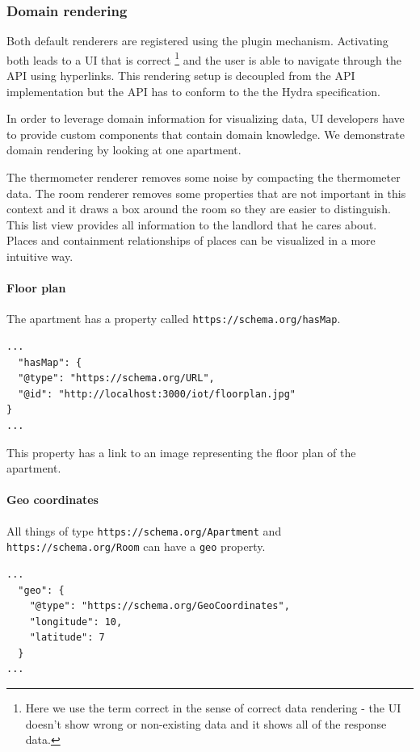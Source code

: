 \subsubsection{Domain rendering}
Both default renderers are registered using the plugin mechanism. Activating both leads to a UI that is correct \footnote{Here we use the term correct in the sense of correct data rendering - the UI doesn't show wrong or non-existing data and it shows all of the response data.} and the user is able to navigate through the API using hyperlinks. This rendering setup is decoupled from the API implementation but the API has to conform to the the Hydra specification.

In order to leverage domain information for visualizing data, UI developers have to provide custom components that contain domain knowledge. We demonstrate domain rendering by looking at one apartment.

The thermometer renderer removes some noise by compacting the thermometer data. The room renderer removes some properties that are not important in this context and it draws a box around the room so they are easier to distinguish. This list view provides all information to the landlord that he cares about. \\
Places and containment relationships of places can be visualized in a more intuitive way.

\paragraph{Floor plan}
The apartment has a property called \lstinline{https://schema.org/hasMap}.

\lstset{language=JSON}
\begin{lstlisting}[caption=The \lstinline{hasMap} property of apartment /apartments/0.]
...
  "hasMap": {
  "@type": "https://schema.org/URL",
  "@id": "http://localhost:3000/iot/floorplan.jpg"
}
...
\end{lstlisting}

This property has a link to an image representing the floor plan of the apartment.

\paragraph{Geo coordinates}
All things of type \lstinline{https://schema.org/Apartment} and \lstinline{https://schema.org/Room} can have a \lstinline{geo} property.

\lstset{language=JSON}
\begin{lstlisting}[caption=The \lstinline{https://schema.org/geo} property of apartment /apartments/0.]
...
  "geo": {
    "@type": "https://schema.org/GeoCoordinates",
    "longitude": 10,
    "latitude": 7
  }
...
\end{lstlisting}


